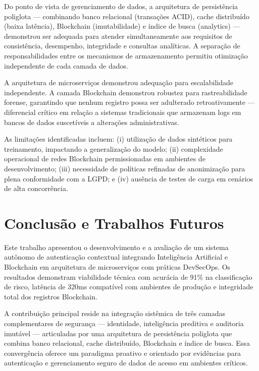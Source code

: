 \documentclass[12pt]{article}
\begin{document}
Do ponto de vista de gerenciamento de dados, a arquitetura de persistência poliglota --- combinando banco relacional (transações ACID), cache distribuído (baixa latência), Blockchain (imutabilidade) e índice de busca (analytics) --- demonstrou ser adequada para atender simultaneamente aos requisitos de consistência, desempenho, integridade e consultas analíticas. A separação de responsabilidades entre os mecanismos de armazenamento permitiu otimização independente de cada camada de dados.

A arquitetura de microserviços demonstrou adequação para escalabilidade independente. A camada Blockchain demonstrou robustez para rastreabilidade forense, garantindo que nenhum registro possa ser adulterado retroativamente --- diferencial crítico em relação a sistemas tradicionais que armazenam logs em bancos de dados suscetíveis a alterações administrativas.

As limitações identificadas incluem: (i) utilização de dados sintéticos para treinamento, impactando a generalização do modelo; (ii) complexidade operacional de redes Blockchain permissionadas em ambientes de desenvolvimento; (iii) necessidade de políticas refinadas de anonimização para plena conformidade com a LGPD; e (iv) ausência de testes de carga em cenários de alta concorrência.

\section{Conclusão e Trabalhos Futuros}

Este trabalho apresentou o desenvolvimento e a avaliação de um sistema autônomo de autenticação contextual integrando Inteligência Artificial e Blockchain em arquitetura de microserviços com práticas DevSecOps. Os resultados demonstram viabilidade técnica com acurácia de 91\% na classificação de risco, latência de 320ms compatível com ambientes de produção e integridade total dos registros Blockchain.

A contribuição principal reside na integração sistêmica de três camadas complementares de segurança --- identidade, inteligência preditiva e auditoria imutável --- articuladas por uma arquitetura de persistência poliglota que combina banco relacional, cache distribuído, Blockchain e índice de busca. Essa convergência oferece um paradigma proativo e orientado por evidências para autenticação e gerenciamento seguro de dados de acesso em ambientes críticos.
\end{document}
